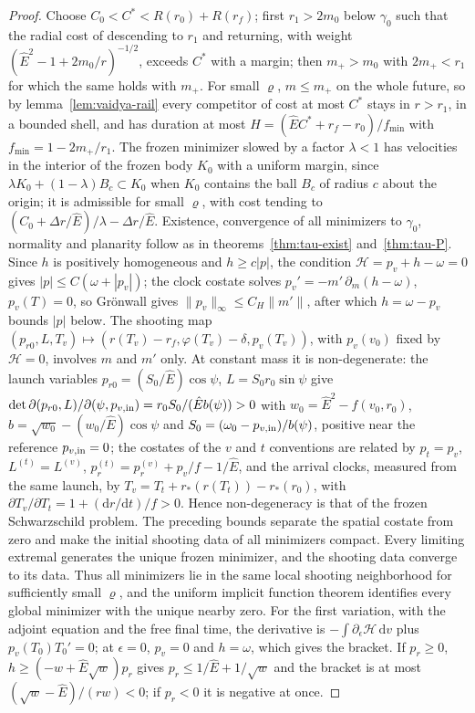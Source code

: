 \documentclass[aip,jmp,amsmath,amssymb,reprint]{revtex4-2}
\newcommand{\Ehat}{\hat E}
\newcommand{\dd}{\mathrm{d}}
\theoremstyle{plain}
\theoremstyle{definition}
\begin{document}
\begin{proof}
Choose $C_0<C^*<R(r_0)+R(r_f)$; first $r_1>2m_0$ below $\gamma_0$ such that the radial cost of
descending to $r_1$ and returning, with weight $(\Ehat^2-1+2m_0/r)^{-1/2}$, exceeds $C^*$ with a
margin; then $m_+>m_0$ with $2m_+<r_1$ for which the same holds with $m_+$. For small $\varrho$,
$m\le m_+$ on the whole future, so by lemma~\ref{lem:vaidya-rail} every competitor of cost at most
$C^*$ stays in $r>r_1$, in a bounded shell, and has duration at most
$H=(\Ehat C^*+r_f-r_0)/f_{\min}$ with $f_{\min}=1-2m_+/r_1$. The frozen minimizer slowed by a factor
$\lambda<1$ has velocities in the interior of the frozen body $K_0$ with a uniform margin, since
$\lambda K_0+(1-\lambda)B_c\subset K_0$ when $K_0$ contains the ball $B_c$ of radius $c$ about the origin; it is admissible for small $\varrho$, with cost tending to
$(C_0+\Delta r/\Ehat)/\lambda-\Delta r/\Ehat$. Existence, convergence of all minimizers to $\gamma_0$,
normality and planarity follow as in theorems~\ref{thm:tau-exist} and~\ref{thm:tau-P}. Since $h$ is
positively homogeneous and $h\ge c|p|$, the condition $\mathcal H=p_v+h-\omega=0$ gives
$|p|\le C(\omega+|p_v|)$; the clock costate solves $p_v'=-m'\,\partial_m(h-\omega)$, $p_v(T)=0$, so Gr\"onwall
gives $\|p_v\|_\infty\le C_H\|m'\|$, after which $h=\omega-p_v$ bounds $|p|$ below. The shooting map
$(p_{r0},L,T_v)\mapsto(r(T_v)-r_f,\varphi(T_v)-\delta,p_v(T_v))$, with $p_v(v_0)$ fixed by $\mathcal H=0$,
involves $m$ and $m'$ only. At constant mass it is non-degenerate: the launch variables
$p_{r0}=(S_0/\Ehat)\cos\psi$, $L=S_0r_0\sin\psi$ give
$\det\partial(p_{r0},L)/\partial(\psi,p_{v,{\rm in}})=r_0S_0/(\Ehat b(\psi))>0$ with
$w_0=\Ehat^2-f(v_0,r_0)$, $b=\sqrt{w_0}-(w_0/\Ehat)\cos\psi$ and $S_0=(\omega_0-p_{v,{\rm in}})/b(\psi)$, positive near
the reference $p_{v,{\rm in}}=0$; the costates of the $v$ and $t$ conventions are related by
$p_t=p_v$, $L^{(t)}=L^{(v)}$, $p_r^{(t)}=p_r^{(v)}+p_v/f-1/\Ehat$, and the arrival clocks, measured from the
same launch, by $T_v=T_t+r_*(r(T_t))-r_*(r_0)$, with $\partial T_v/\partial T_t=1+(\dd r/\dd t)/f>0$.
Hence non-degeneracy is that of the frozen Schwarzschild problem. The preceding bounds
separate the spatial costate from zero and make the initial shooting data of all minimizers
compact. Every limiting extremal generates the unique frozen minimizer, and the shooting
data converge to its data. Thus all minimizers lie in the same local shooting neighborhood
for sufficiently small $\varrho$, and the uniform implicit function theorem identifies every global
minimizer with the unique nearby zero. For the
first variation, with the adjoint equation and the free final time, the derivative is
$-\int\partial_\epsilon\mathcal H\,\dd v$ plus $p_v(T_0)T_0'=0$; at $\epsilon=0$, $p_v=0$ and $h=\omega$, which gives the
bracket. If $p_r\ge0$, $h\ge(-w+\Ehat\sqrt w)p_r$ gives $p_r\le1/\Ehat+1/\sqrt w$ and the bracket is at
most $(\sqrt w-\Ehat)/(rw)<0$; if $p_r<0$ it is negative at once.
\end{proof}
\end{document}

